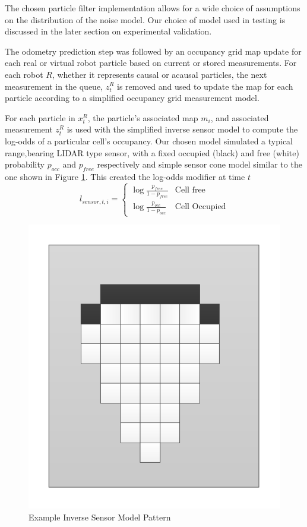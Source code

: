 The chosen particle filter implementation allows for a wide choice of assumptions on the distribution of the noise model. Our choice of model used in testing is discussed in the later section on experimental validation.

The odometry prediction step was followed by an occupancy grid map update for each real or virtual robot particle based on current or stored measurements. For each robot $R$, whether it represents causal or acausal particles, the next measurement in the queue, $z_t^R$ is removed and used to update the map for each particle according to a simplified occupancy grid measurement model.

For each particle in $x_t^R$,  the particle's associated map $m_i$, and associated measurement $z_t^R$ is used with the simplified inverse sensor model to compute the log-odds of a particular cell’s occupancy. Our chosen model simulated a typical range,bearing LIDAR type sensor, with a fixed occupied (black) and free (white) probability $p_{occ}$ and $p_{free}$ respectively and simple sensor cone model similar to the one shown in Figure \ref{fig:invsensor}. This created the log-odds modifier at time $t$
$$l_{sensor,t,i}=
\begin{cases}
\log\frac{p_{free}}{1-p_{free}} & \text{Cell free}\\ 
\log\frac{p_{occ}}{1-p_{occ}} & \text{Cell Occupied}
\end{cases}$$

\begin{figure}[ht]
\centering
\includegraphics[width=\columnwidth]{../FinalFigures/invsensormodel.pdf}
\caption{Example Inverse Sensor Model Pattern}
\label{fig:invsensor}
\end{figure}

